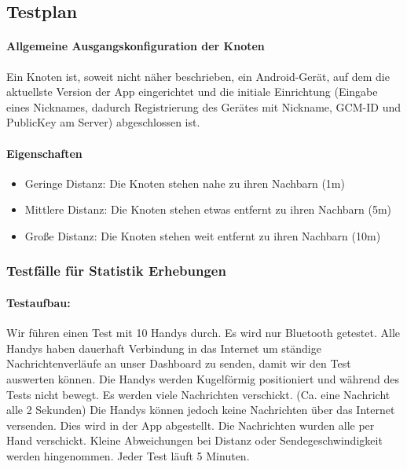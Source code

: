 \subsection{Testplan}

\paragraph{Allgemeine Ausgangskonfiguration der Knoten}

Ein Knoten ist, soweit nicht näher beschrieben, ein Android-Gerät, auf dem die aktuellste Version der App eingerichtet und die initiale Einrichtung (Eingabe eines Nicknames, dadurch Registrierung des Gerätes mit Nickname, GCM-ID und PublicKey am Server) abgeschlossen ist.

\paragraph{Eigenschaften}

\begin{itemize}
  \tightlist
  \item Geringe Distanz: Die Knoten stehen nahe zu ihren Nachbarn (1m)
  \item Mittlere Distanz: Die Knoten stehen etwas entfernt zu ihren Nachbarn (5m)
  \item Große Distanz: Die Knoten stehen weit entfernt zu ihren Nachbarn (10m)
\end{itemize}

\subsubsection{Testfälle für Statistik Erhebungen}

\paragraph*{Testaufbau:}
Wir führen einen Test mit 10 Handys durch. Es wird nur Bluetooth getestet. Alle Handys haben dauerhaft Verbindung in das Internet um ständige Nachrichtenverläufe an unser Dashboard zu senden, damit wir den Test auswerten können. Die Handys werden Kugelförmig positioniert und
während des Tests nicht bewegt. Es werden viele Nachrichten verschickt. (Ca. eine Nachricht alle 2 Sekunden) Die Handys können jedoch keine Nachrichten über das Internet versenden. Dies wird in der App abgestellt. Die Nachrichten wurden alle per Hand verschickt. Kleine Abweichungen bei Distanz oder Sendegeschwindigkeit werden hingenommen. Jeder Test läuft 5 Minuten. 
